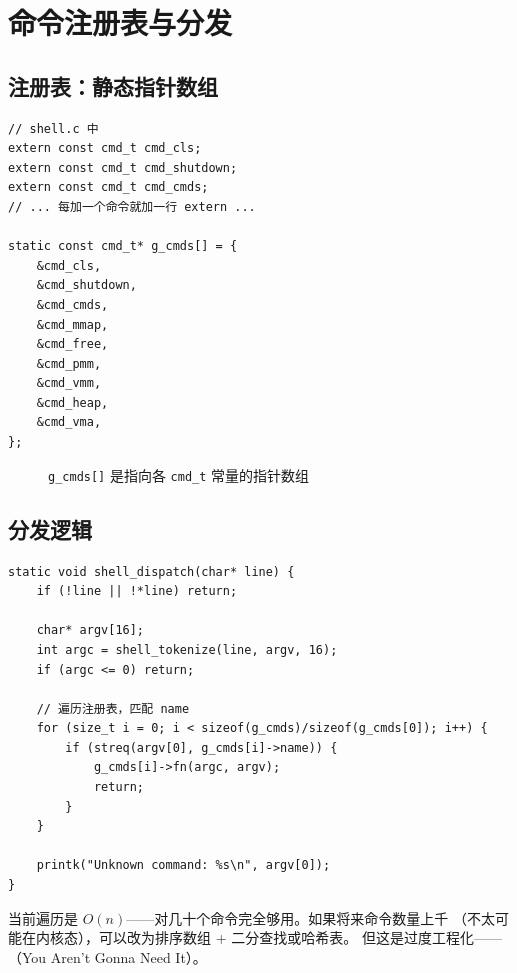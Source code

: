 \section{命令注册表与分发}

\subsection{注册表：静态指针数组}

\begin{lstlisting}[style=cstyle]
// shell.c 中
extern const cmd_t cmd_cls;
extern const cmd_t cmd_shutdown;
extern const cmd_t cmd_cmds;
// ... 每加一个命令就加一行 extern ...

static const cmd_t* g_cmds[] = {
    &cmd_cls,
    &cmd_shutdown,
    &cmd_cmds,
    &cmd_mmap,
    &cmd_free,
    &cmd_pmm,
    &cmd_vmm,
    &cmd_heap,
    &cmd_vma,
};
\end{lstlisting}

\begin{figure}[H]
  \centering
  
  \caption{\texttt{g\_cmds[]} 是指向各 \texttt{cmd\_t} 常量的指针数组}
\end{figure}

\subsection{分发逻辑}

\begin{lstlisting}[style=cstyle]
static void shell_dispatch(char* line) {
    if (!line || !*line) return;

    char* argv[16];
    int argc = shell_tokenize(line, argv, 16);
    if (argc <= 0) return;

    // 遍历注册表，匹配 name
    for (size_t i = 0; i < sizeof(g_cmds)/sizeof(g_cmds[0]); i++) {
        if (streq(argv[0], g_cmds[i]->name)) {
            g_cmds[i]->fn(argc, argv);
            return;
        }
    }

    printk("Unknown command: %s\n", argv[0]);
}
\end{lstlisting}

\begin{thinkbox}
当前遍历是 $O(n)$——对几十个命令完全够用。如果将来命令数量上千
（不太可能在内核态），可以改为排序数组 + 二分查找或哈希表。
但这是过度工程化——（You Aren't Gonna Need It）。
\end{thinkbox}


